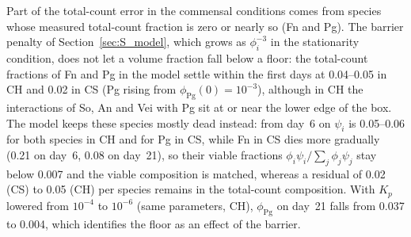\documentclass[11pt,a4paper]{article}
\begin{document}
Part of the total-count error in the commensal conditions comes from species whose measured total-count fraction is zero or nearly so (Fn and Pg).
The barrier penalty of Section~\ref{sec:S_model}, which grows as $\phi_i^{-3}$ in the stationarity condition, does not let a volume fraction fall below a floor: the total-count fractions of Fn and Pg in the model settle within the first days at 0.04--0.05 in CH and 0.02 in CS (Pg rising from $\phi_{\mathrm{Pg}}(0)=10^{-3}$), although in CH the interactions of So, An and Vei with Pg sit at or near the lower edge of the box.
The model keeps these species mostly dead instead: from day~6 on $\psi_i$ is 0.05--0.06 for both species in CH and for Pg in CS, while Fn in CS dies more gradually (0.21 on day~6, 0.08 on day~21), so their viable fractions $\phi_i\psi_i/\sum_j\phi_j\psi_j$ stay below 0.007 and the viable composition is matched, whereas a residual of 0.02 (CS) to 0.05 (CH) per species remains in the total-count composition.
With $K_p$ lowered from $10^{-4}$ to $10^{-6}$ (same parameters, CH), $\phi_{\mathrm{Pg}}$ on day~21 falls from 0.037 to 0.004, which identifies the floor as an effect of the barrier.
\end{document}
